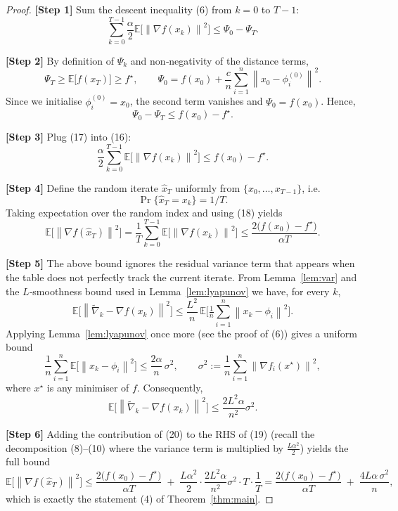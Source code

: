 \documentclass{article}
\newcommand{\E}{\mathbb{E}}
\newcommand{\grad}{\nabla}
\newcommand{\norm}[1]{\left\|#1\right\|}
\begin{document}
\begin{proof}
\textbf{[Step 1]} Sum the descent inequality (6) from $k=0$ to $T-1$:
\[
\sum_{k=0}^{T-1}\frac{\alpha}{2}\E\!\bigl[\norm{\grad f(x_k)}^{2}\bigr]
\le \Psi_{0}-\Psi_{T}.
\tag{16}
\]

\textbf{[Step 2]} By definition of $\Psi_k$ and non‑negativity of the distance terms,
\[
\Psi_{T}\ge \E\!\bigl[f(x_T)\bigr]\ge f^{\star},
\qquad
\Psi_{0}=f(x_0)+\frac{c}{n}\sum_{i=1}^{n}\norm{x_0-\phi_i^{(0)}}^{2}.
\]
Since we initialise $\phi_i^{(0)}=x_0$, the second term vanishes and $\Psi_{0}=f(x_0)$. Hence,
\[
\Psi_{0}-\Psi_{T}\le f(x_0)-f^{\star}.
\tag{17}
\]

\textbf{[Step 3]} Plug (17) into (16):
\[
\frac{\alpha}{2}\sum_{k=0}^{T-1}\E\!\bigl[\norm{\grad f(x_k)}^{2}\bigr]
\le f(x_0)-f^{\star}.
\tag{18}
\]

\textbf{[Step 4]} Define the random iterate $\hat x_T$ uniformly from $\{x_0,\dots,x_{T-1}\}$, i.e.
\[
\Pr\{\hat x_T = x_k\}=1/T.
\]
Taking expectation over the random index and using (18) yields
\[
\E\!\bigl[\norm{\grad f(\hat x_T)}^{2}\bigr]
=\frac{1}{T}\sum_{k=0}^{T-1}\E\!\bigl[\norm{\grad f(x_k)}^{2}\bigr]
\le \frac{2\bigl(f(x_0)-f^{\star}\bigr)}{\alpha T}.
\tag{19}
\]

\textbf{[Step 5]} The above bound ignores the residual variance term that appears when the table does not perfectly track the current iterate. From Lemma~\ref{lem:var} and the $L$‑smoothness bound used in Lemma~\ref{lem:lyapunov} we have, for every $k$,
\[
\E\!\bigl[\norm{\widetilde{\nabla}_k-\grad f(x_k)}^{2}\bigr]
\le \frac{L^{2}}{n}\,\E\!\bigl[\tfrac1n\sum_{i=1}^{n}\norm{x_k-\phi_i}^{2}\bigr].
\]
Applying Lemma~\ref{lem:lyapunov} once more (see the proof of (6)) gives a uniform bound
\[
\frac1n\sum_{i=1}^{n}\E\!\bigl[\norm{x_k-\phi_i}^{2}\bigr]\le \frac{2\alpha}{n}\,\sigma^{2},
\qquad
\sigma^{2}:=\frac1n\sum_{i=1}^{n}\norm{\grad f_i(x^{\star})}^{2},
\]
where $x^{\star}$ is any minimiser of $f$. Consequently,
\[
\E\!\bigl[\norm{\widetilde{\nabla}_k-\grad f(x_k)}^{2}\bigr]
\le \frac{2L^{2}\alpha}{n^{2}}\sigma^{2}.
\tag{20}
\]

\textbf{[Step 6]} Adding the contribution of (20) to the RHS of (19) (recall the decomposition (8)–(10) where the variance term is multiplied by $\frac{L\alpha^{2}}{2}$) yields the full bound
\[
\E\!\bigl[\norm{\grad f(\hat x_T)}^{2}\bigr]
\le \frac{2\bigl(f(x_0)-f^{\star}\bigr)}{\alpha T}
\;+\;
\frac{L\alpha^{2}}{2}\cdot\frac{2L^{2}\alpha}{n^{2}}\sigma^{2}\cdot T\cdot\frac{1}{T}
=
\frac{2\bigl(f(x_0)-f^{\star}\bigr)}{\alpha T}
\;+\;
\frac{4L\alpha\,\sigma^{2}}{n},
\]
which is exactly the statement (4) of Theorem~\ref{thm:main}. \qedhere
\end{proof}
\end{document}
